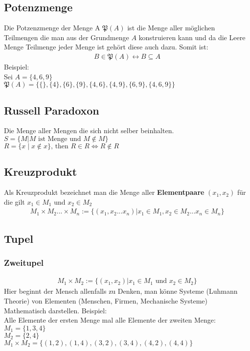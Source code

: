 \documentclass[a4paper]{scrartcl}
\begin{document}
\subsection{Potenzmenge}
Die Potzenzmenge der Menge A $\mathfrak{P}(A)$ ist die Menge aller möglichen Teilmengen die man aus der Grundmenge $A$ konstruieren kann und da die Leere Menge Teilmenge jeder Menge ist gehört diese auch dazu. Somit ist:
\begin{align}
B \in \mathfrak{P}(A) \leftrightarrow B \subseteq A
\end{align}
Beispiel: \\
Sei $A = \{ 4, 6, 9\}$ \\
$\mathfrak{P}(A) = \{ \{ \}, \{ 4\}, \{6 \}, \{9 \}, \{ 4, 6\}, \{4, 9\}, \{6, 9 \}, \{ 4, 6, 9\} \}$

\subsection{Russell Paradoxon}
Die Menge aller Mengen die sich nicht selber beinhalten. \\
$S = \{ M | M \text{ ist Menge und }M \not\in M \}$ \\
$R = \{ x \mid x \not \in x \} \text{, then } R \in R \iff R \not \in R$

\newpage
\subsection{Kreuzprodukt}
Als Kreuzprodukt bezeichnet man die Menge aller \textbf{Elementpaare} $(x_1, x_2)$ für die gilt $x_1 \in M_1$ und $x_2 \in M_2$
\begin{align}
M_1 \times M_2 ... \times M_n := \{ (x_1, x_2 ... x_n) | x_1 \in M_1, x_2 \in M_2 ... x_n \in M_n \} 
\end{align}


\subsection{Tupel}
\subsubsection{Zweitupel}
\begin{align}
M_1 \times M_2 := \{( x_1, x_2 ) | x_1 \in M_1 \text{ und } x_2 \in M_2 \} 
\end{align}
Hier beginnt der Mensch allenfalls zu Denken, man könne Systeme (Luhmann Theorie) von Elementen (Menschen, Firmen, Mechanische Systeme) Mathematisch darstellen.
Beispiel: \\
Alle Elemente der ersten Menge mal alle Elemente der zweiten Menge: \\
$M_1 = \{1, 3, 4\}$ \\
$M_2 = \{2, 4\}$ \\
$M_1 \times M_2 = \{(1,2), (1,4), (3,2), (3,4), (4,2), (4,4) \}$
\end{document}
